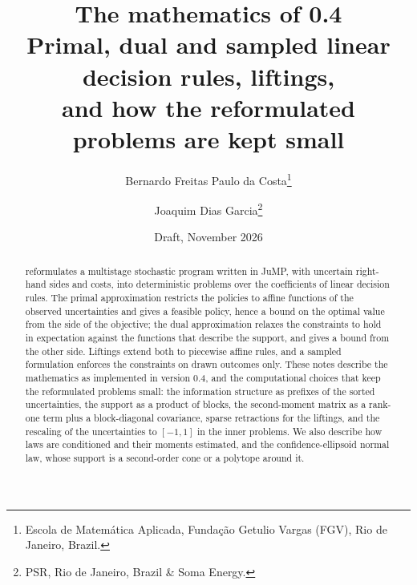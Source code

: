 \documentclass[11pt,a4paper]{article}
\title{The mathematics of \pkg{} 0.4\\[0.5ex]
\large Primal, dual and sampled linear decision rules, liftings,\\
and how the reformulated problems are kept small}
\author{Bernardo Freitas Paulo da Costa\thanks{Escola de Matem\'atica Aplicada, Funda\c{c}\~ao Getulio Vargas (FGV), Rio de Janeiro, Brazil.}
\and Joaquim Dias Garcia\thanks{PSR, Rio de Janeiro, Brazil \& Soma Energy.}}
\date{Draft, November 2026}
\numberwithin{equation}{section}
\begin{document}
\maketitle

\begin{abstract}
\pkg{} reformulates a multistage stochastic program written in JuMP, with uncertain right-hand sides and costs, into deterministic problems over the coefficients of linear decision rules.
The primal approximation restricts the policies to affine functions of the observed uncertainties and gives a feasible policy, hence a bound on the optimal value from the side of the objective;
the dual approximation relaxes the constraints to hold in expectation against the functions that describe the support, and gives a bound from the other side.
Liftings extend both to piecewise affine rules, and a sampled formulation enforces the constraints on drawn outcomes only.
These notes describe the mathematics as implemented in version 0.4,
and the computational choices that keep the reformulated problems small:
the information structure as prefixes of the sorted uncertainties,
the support as a product of blocks,
the second-moment matrix as a rank-one term plus a block-diagonal covariance,
sparse retractions for the liftings,
and the rescaling of the uncertainties to $[-1, 1]$ in the inner problems.
We also describe how laws are conditioned and their moments estimated,
and the confidence-ellipsoid normal law, whose support is a second-order cone or a polytope around it.
\end{abstract}

\tableofcontents












\appendix







\end{document}
